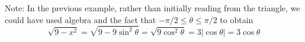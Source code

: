 \begin{frame}
Note: In the previous example, rather than initially reading from the triangle, we could have used algebra and the fact that $-\pi /2 \leq \theta \leq \pi / 2$ to obtain
\[
\sqrt{9 - x^2} =
\sqrt{9 - 9\sin^2 \theta} =
\sqrt{9 \cos^2 \theta} =
3 |\cos  \theta | =
3 \cos  \theta
\]




\end{frame}




